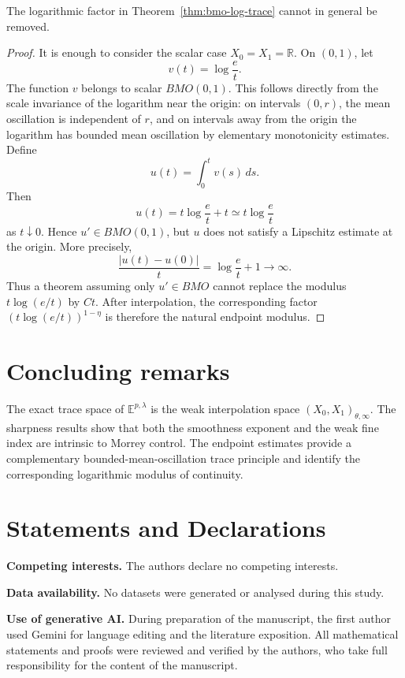 \documentclass[smallextended,envcountsect,envcountsame]{svjour3}
\begin{document}
	\begin{proposition}\label{prop:bmo-log-sharp}
	The logarithmic factor in Theorem~\ref{thm:bmo-log-trace} cannot in general be removed.
	\end{proposition}

	\begin{proof}
	It is enough to consider the scalar case \(X_0=X_1=\mathbb R\).  On \((0,1)\), let
	\[
	v(t)=\log\frac{e}{t}.
	\]
	The function \(v\) belongs to scalar \(BMO(0,1)\).  This follows directly from the scale invariance of the logarithm near the origin: on intervals \((0,r)\), the mean oscillation is independent of \(r\), and on intervals away from the origin the logarithm has bounded mean oscillation by elementary monotonicity estimates.
	Define
	\[
	u(t)=\int_0^t v(s)\,ds.
	\]
	Then
	\[
	u(t)=t\log\frac{e}{t}+t
		\simeq t\log\frac{e}{t}
	\]
	as \(t\downarrow0\).  Hence \(u'\in BMO(0,1)\), but \(u\) does not satisfy a Lipschitz estimate at the origin.  More precisely,
	\[
	\frac{|u(t)-u(0)|}{t}=\log\frac{e}{t}+1\to\infty.
	\]
	Thus a theorem assuming only \(u'\in BMO\) cannot replace the modulus \(t\log(e/t)\) by \(Ct\).  After interpolation, the corresponding factor \((t\log(e/t))^{1-\eta}\) is therefore the natural endpoint modulus.
	\end{proof}


	
\section{Concluding remarks}
The exact trace space of $\mathbb E^{p,\lambda}$ is the weak interpolation space $(X_0,X_1)_{\theta,\infty}$. The sharpness results show that both the smoothness exponent and the weak fine index are intrinsic to Morrey control. The endpoint estimates provide a complementary bounded-mean-oscillation trace principle and identify the corresponding logarithmic modulus of continuity.

\section*{Statements and Declarations}
\noindent\textbf{Competing interests.} The authors declare no competing interests.

\noindent\textbf{Data availability.} No datasets were generated or analysed during this study.

\noindent\textbf{Use of generative AI.} During preparation of the manuscript, the first author used Gemini for language editing and the literature exposition. All mathematical statements and proofs were reviewed and verified by the authors, who take full responsibility for the content of the manuscript.
\end{document}
